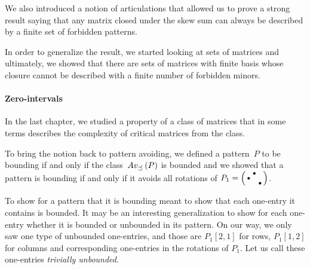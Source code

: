 We also introduced a notion of articulations that allowed us to prove a strong result saying that any matrix closed under the skew sum can always be described by a finite set of forbidden patterns.

In order to generalize the result, we started looking at sets of matrices and ultimately, we showed that there are sets of matrices with finite basis whose closure cannot be described with a finite number of forbidden minors.

\paragraph{Zero-intervals}
In the last chapter, we studied a property of a class of matrices that in some terms describes the complexity of critical matrices from the class.

To bring the notion back to pattern avoiding, we defined a pattern~$P$ to be bounding if and only if the class~$Av_{\preceq}\left(P\right)$ is bounded and we showed that a pattern is bounding if and only if it avoids all rotations of $P_1=\left(\begin{smallmatrix} &\bullet& \\\bullet& & \\ & &\bullet\end{smallmatrix}\right)$.

To show for a pattern that it is bounding meant to show that each one-entry it contains is bounded. It may be an interesting generalization to show for each one-entry whether it is bounded or unbounded in its pattern. On our way, we only saw one type of unbounded one-entries, and those are $P_1[2,1]$ for rows, $P_1[1,2]$ for columns and corresponding one-entries in the rotations of $P_1$. Let us call these one-entries \emph{trivially unbounded}.

